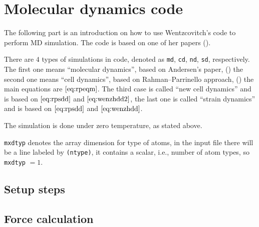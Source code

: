 
\section{Molecular dynamics code}

The following part is an introduction on how to use
Wentzcovitch's code to perform MD simulation. The code is
based on one of her papers (\cite{Wentzcovitch:1991ka}).

There are $4$ types of simulations in code,
denoted as \texttt{md}, \texttt{cd}, \texttt{nd}, \texttt{sd},
respectively. The first one means ``molecular dynamics'',
based on Andersen's paper, (\cite{Andersen:1980ew})
the second one means ``cell dynamics'', based on
Rahman–Parrinello approach, (\cite{Parrinello:1980kx})
the main equations are $\eqref{eq:rpeqm}$.
The third case is called ``new cell dynamics'' and is based on
$\eqref{eq:rpsdd}$ and $\eqref{eq:wenzhdd2}$,
the last one is called ``strain dynamics'' and is based on
$\eqref{eq:rpsdd}$ and $\eqref{eq:wenzhdd}$.

The simulation is done under zero temperature, as stated above.

\texttt{mxdtyp} denotes the array dimension for type of atoms,
in the input file there will be a line labeled by \texttt{(ntype)}, it
contains a scalar, i.e., number of atom types, so \texttt{mxdtyp} $=1$.



\subsection{Setup steps}











\subsection{Force calculation}








